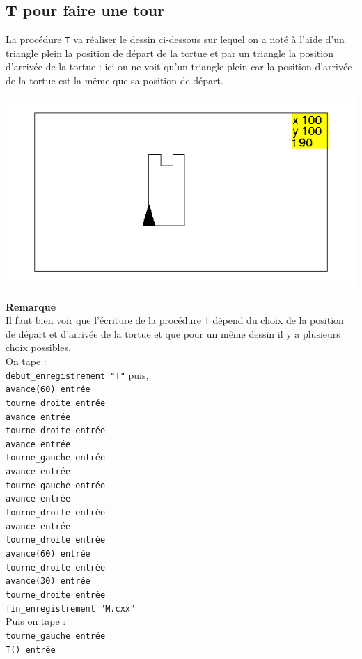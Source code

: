 \documentclass[a4paper,11pt]{book}
\begin{document}
\subsection{T pour faire une tour}
La proc\'edure {\tt T} va r\'ealiser le dessin ci-dessous sur lequel on a 
not\'e \`a l'aide d'un triangle plein la position de d\'epart de la tortue et
 par un triangle la position d'arriv\'ee de la tortue : ici on ne voit qu'un 
triangle plein car la position d'arriv\'ee  de la tortue est la m\^eme que sa 
position de d\'epart.
\begin{center}\includegraphics[width=\textwidth]{tortuett}\end{center}
{\bf Remarque}\\
Il faut bien voir que l'\'ecriture de la proc\'edure {\tt T} d\'epend du choix
de la position de d\'epart et d'arriv\'ee de la tortue et que pour un m\^eme 
dessin il y a plusieurs choix possibles.\\ 
On tape :\\
{\tt debut\_enregistrement "T"} puis,\\
{\tt avance(60) entr\'ee}\\
{\tt tourne\_droite entr\'ee}\\ 
{\tt avance entr\'ee}\\
{\tt tourne\_droite entr\'ee}\\ 
{\tt avance entr\'ee}\\
{\tt tourne\_gauche entr\'ee}\\
{\tt avance entr\'ee}\\
{\tt tourne\_gauche entr\'ee}\\
{\tt avance entr\'ee}\\
{\tt tourne\_droite entr\'ee}\\ 
{\tt avance entr\'ee}\\
{\tt tourne\_droite entr\'ee}\\ 
{\tt avance(60) entr\'ee}\\
{\tt tourne\_droite entr\'ee}\\ 
{\tt avance(30) entr\'ee}\\
{\tt tourne\_droite entr\'ee}\\ 
{\tt fin\_enregistrement "M.cxx"}\\
Puis on tape :\\
{\tt tourne\_gauche entr\'ee}\\
{\tt T() entr\'ee}
\end{document}
